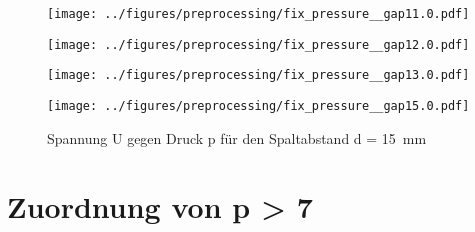 \begin{figure}[htbp]
   \begin{minipage}[t]{0.3\textwidth}
        \centering
        \texttt{[image: ../figures/preprocessing/fix\_pressure\_\_gap11.0.pdf]}
        \caption{Spannung U gegen Druck p für den Spaltabstand d = \SI{11}{\milli\meter}}
        \label{fig:fix_pressure_g11}
    \end{minipage}\hfill

   \begin{minipage}[t]{0.3\textwidth}
        \centering
        \texttt{[image: ../figures/preprocessing/fix\_pressure\_\_gap12.0.pdf]}
        \caption{Spannung U gegen Druck p für den Spaltabstand d = \SI{12}{\milli\meter}}
        \label{fig:fix_pressure_g12}
    \end{minipage}\hfill
   \begin{minipage}[t]{0.3\textwidth}
        \centering
        \texttt{[image: ../figures/preprocessing/fix\_pressure\_\_gap13.0.pdf]}
        \caption{Spannung U gegen Druck p für den Spaltabstand d = \SI{13}{\milli\meter}}
        \label{fig:fix_pressure_g13}
    \end{minipage}\hfill

   \begin{minipage}[t]{0.3\textwidth}
        \centering
        \texttt{[image: ../figures/preprocessing/fix\_pressure\_\_gap15.0.pdf]}
        \caption{Spannung U gegen Druck p für den Spaltabstand d = \SI{15}{\milli\meter}}
        \label{fig:fix_pressure_g15}
    \end{minipage}\hfill






    \vspace{0.5em} %
   \end{figure}




\section{Zuordnung von p > 7}
\label{sec:pressurelarge}




